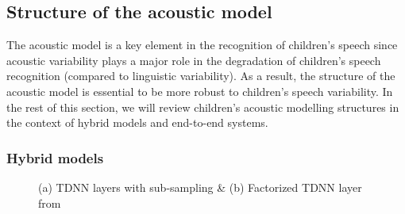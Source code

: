 
\subsection{Structure of the acoustic model}%
The acoustic model is a key element in the recognition of children's speech since acoustic variability plays a major role in the degradation of children's speech recognition (compared to linguistic variability). As a result, the structure of the acoustic model is essential to be more robust to children's speech variability. In the rest of this section, we will review children's acoustic modelling structures in the context of hybrid models and end-to-end systems.
\subsubsection{Hybrid models}


\begin{figure}[ht]
\centering
{}
\caption{(a) TDNN layers with sub-sampling \& (b) Factorized TDNN layer from \cite{TDNN-F}}
\end{figure}

